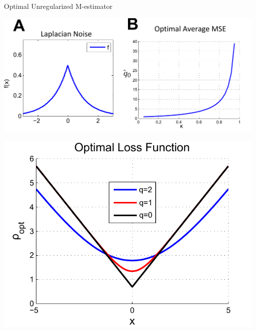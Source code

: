 \documentclass[pdf]{beamer}
\begin{document}
\begin{frame}{Optimal Unregularized M-estimator}


        \begin{center}
            \includegraphics[width = .5\linewidth]{unRegNoiseOpt.pdf}
        \end{center}


        \begin{center}
            \includegraphics[width = .5\linewidth]{opt_loss.pdf}
        \end{center}

\end{frame}
\end{document}
